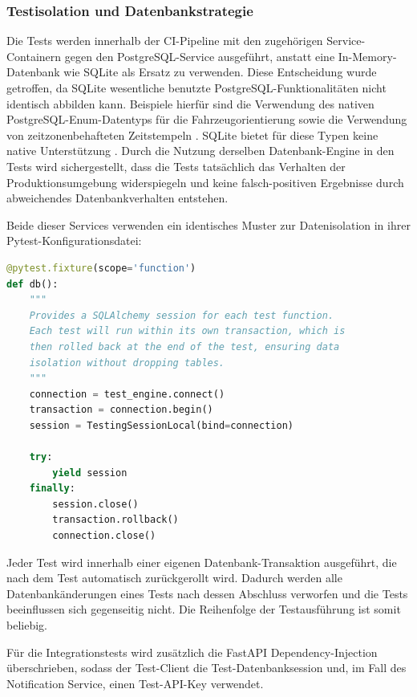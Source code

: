 \subsubsection{Testisolation und Datenbankstrategie}

Die Tests werden innerhalb der CI-Pipeline mit den zugehörigen Service-Containern gegen den PostgreSQL-Service ausgeführt, anstatt eine In-Memory-Datenbank wie SQLite als Ersatz zu verwenden.
Diese Entscheidung wurde getroffen, da SQLite wesentliche benutzte PostgreSQL-Funktionalitäten nicht identisch abbilden kann.
Beispiele hierfür sind die Verwendung des nativen PostgreSQL-Enum-Datentyps \cite{postgresql_enum} für die Fahrzeugorientierung sowie die Verwendung von zeitzonenbehafteten Zeitstempeln \cite{postgresql_datetime}.
SQLite bietet für diese Typen keine native Unterstützung \cite{sqlite_datatypes}.
Durch die Nutzung derselben Datenbank-Engine in den Tests wird sichergestellt, dass die Tests tatsächlich das Verhalten der Produktionsumgebung widerspiegeln und keine falsch-positiven Ergebnisse durch abweichendes Datenbankverhalten entstehen.

\newpage
Beide dieser Services verwenden ein identisches Muster zur Datenisolation in ihrer Pytest-Konfigurationsdatei:

\begin{lstlisting}[language=Python, caption={Pytest-Fixture für Datenisolation}, label={lst:conftest}]
@pytest.fixture(scope='function')
def db():
    """
    Provides a SQLAlchemy session for each test function.
    Each test will run within its own transaction, which is 
    then rolled back at the end of the test, ensuring data 
    isolation without dropping tables.
    """
    connection = test_engine.connect()
    transaction = connection.begin()
    session = TestingSessionLocal(bind=connection)

    try:
        yield session
    finally:
        session.close()
        transaction.rollback()
        connection.close()
\end{lstlisting}

Jeder Test wird innerhalb einer eigenen Datenbank-Transaktion ausgeführt, die nach dem Test automatisch zurückgerollt wird.
Dadurch werden alle Datenbankänderungen eines Tests nach dessen Abschluss verworfen und die Tests beeinflussen sich gegenseitig nicht.
Die Reihenfolge der Testausführung ist somit beliebig.

Für die Integrationstests wird zusätzlich die FastAPI Dependency-Injection überschrieben, sodass der Test-Client die Test-Datenbanksession und, im Fall des Notification Service, einen Test-API-Key verwendet.

